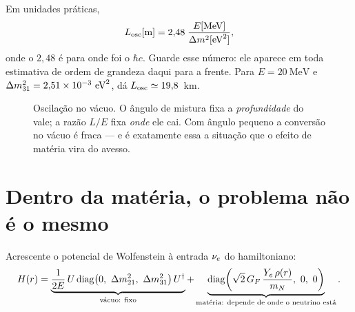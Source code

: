 Em unidades práticas,
\begin{equation}
  L_{\text{osc}}[\text{m}] = 2{,}48\;\frac{E[\text{MeV}]}{\Delta m^2[\text{eV}^2]},
\end{equation}
onde o $2{,}48$ é para onde foi o $\hbar c$. Guarde esse número: ele aparece em
toda estimativa de ordem de grandeza daqui para a frente. Para
$E = 20\ \text{MeV}$ e $\dm{31} = 2{,}51\times10^{-3}\ \text{eV}^2$, dá
$L_{\text{osc}} \simeq 19{,}8$~km.

\begin{figure}[!htb]
\centering
{}
\caption{Oscilação no vácuo. O ângulo de mistura fixa a \emph{profundidade} do
vale; a razão $L/E$ fixa \emph{onde} ele cai. Com ângulo pequeno a conversão no
vácuo é fraca --- e é exatamente essa a situação que o efeito de matéria vira
do avesso.}
\end{figure}

\section{Dentro da matéria, o problema não é o mesmo}
\label{sec:materia}

Acrescente o potencial de Wolfenstein à entrada $\nu_e$ do hamiltoniano:
\begin{equation}
  H(r) = \underbrace{\frac{1}{2E}\,U
      \operatorname{diag}\!\left(0,\ \Delta m^2_{21},\ \Delta m^2_{31}\right) U^{\dagger}}_{\text{vácuo: fixo}}
    + \underbrace{\operatorname{diag}\!\left(\sqrt{2}\,G_F\,\frac{Y_e\,\rho(r)}{m_N},
      \ 0,\ 0\right)}_{\text{matéria: depende de onde o neutrino está}}.
\label{eq:hamiltoniano}
\end{equation}

